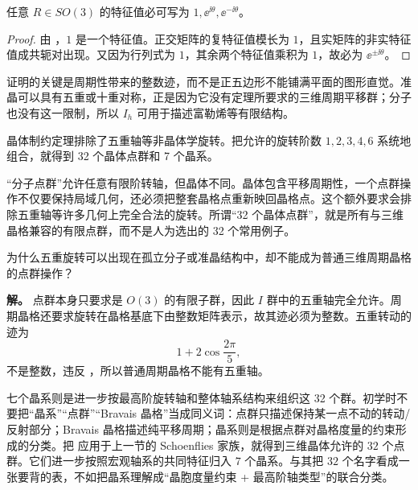\begin{proposition}
任意 $R\in SO(3)$ 的特征值必可写为 $1,\ee^{\ii\theta},\ee^{-\ii\theta}$。
\end{proposition}

\begin{proof}
由 ，$1$ 是一个特征值。正交矩阵的复特征值模长为 $1$，且实矩阵的非实特征值成共轭对出现。又因为行列式为 $1$，其余两个特征值乘积为 $1$，故必为 $\ee^{\pm\ii\theta}$。
\end{proof}


证明的关键是周期性带来的整数迹，而不是正五边形不能铺满平面的图形直觉。准晶可以具有五重或十重对称，正是因为它没有定理所要求的三维周期平移群；分子也没有这一限制，所以 $I_h$ 可用于描述富勒烯等有限结构。

晶体制约定理排除了五重轴等非晶体学旋转。把允许的旋转阶数 $1,2,3,4,6$ 系统地组合，就得到 32 个晶体点群和 7 个晶系。

“分子点群”允许任意有限阶转轴，但晶体不同。晶体包含平移周期性，一个点群操作不仅要保持局域几何，还必须把整套晶格点重新映回晶格点。这个额外要求会排除五重轴等许多几何上完全合法的旋转。所谓“32 个晶体点群”，就是所有与三维晶格兼容的有限点群，而不是人为选出的 32 个常用例子。

\begin{workedexample}
为什么五重旋转可以出现在孤立分子或准晶结构中，却不能成为普通三维周期晶格的点群操作？

\textbf{解。} 点群本身只要求是 $O(3)$ 的有限子群，因此 $I$ 群中的五重轴完全允许。周期晶格还要求旋转在晶格基底下由整数矩阵表示，故其迹必须为整数。五重转动的迹为
\[
1+2\cos\frac{2\pi}{5},
\]
不是整数，违反 ，所以普通周期晶格不能有五重轴。
\end{workedexample}


七个晶系则是进一步按最高阶旋转轴和整体轴系结构来组织这 32 个群。初学时不要把“晶系”“点群”“Bravais 晶格”当成同义词：点群只描述保持某一点不动的转动/反射部分；Bravais 晶格描述纯平移周期；晶系则是根据点群对晶格度量的约束形成的分类。把  应用于上一节的 Schoenflies 家族，就得到三维晶体允许的 $32$ 个点群。它们进一步按照宏观轴系的共同特征归入 $7$ 个晶系。与其把 $32$ 个名字看成一张要背的表，不如把晶系理解成“晶胞度量约束 + 最高阶轴类型”的联合分类。

